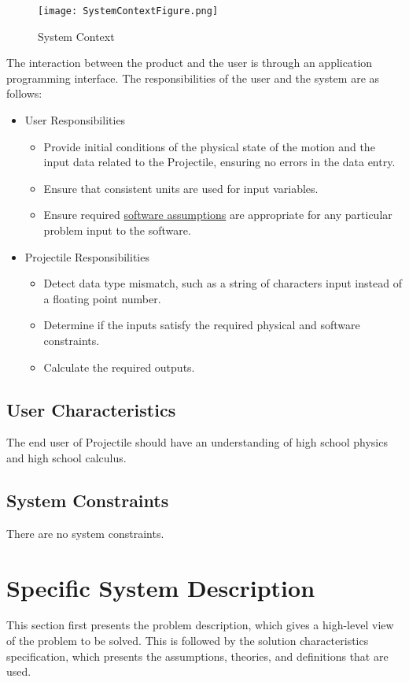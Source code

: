 \documentclass[12pt]{article}
\begin{document}
\begin{figure}
\begin{center}
\texttt{[image: SystemContextFigure.png]}
\caption{System Context}
\label{Figure:sysCtxDiag}
\end{center}
\end{figure}
The interaction between the product and the user is through an application programming interface. The responsibilities of the user and the system are as follows:

\begin{itemize}
\item{User Responsibilities}
\begin{itemize}
\item{Provide initial conditions of the physical state of the motion and the input data related to the Projectile, ensuring no errors in the data entry.}
\item{Ensure that consistent units are used for input variables.}
\item{Ensure required \hyperref[Sec:Assumps]{software assumptions} are appropriate for any particular problem input to the software.}
\end{itemize}
\item{Projectile Responsibilities}
\begin{itemize}
\item{Detect data type mismatch, such as a string of characters input instead of a floating point number.}
\item{Determine if the inputs satisfy the required physical and software constraints.}
\item{Calculate the required outputs.}
\end{itemize}
\end{itemize}

\subsection{User Characteristics}
\label{Sec:UserChars}
The end user of Projectile should have an understanding of high school physics and high school calculus.

\subsection{System Constraints}
\label{Sec:SysConstraints}
There are no system constraints.

\section{Specific System Description}
\label{Sec:SpecSystDesc}
This section first presents the problem description, which gives a high-level view of the problem to be solved. This is followed by the solution characteristics specification, which presents the assumptions, theories, and definitions that are used.
\end{document}
